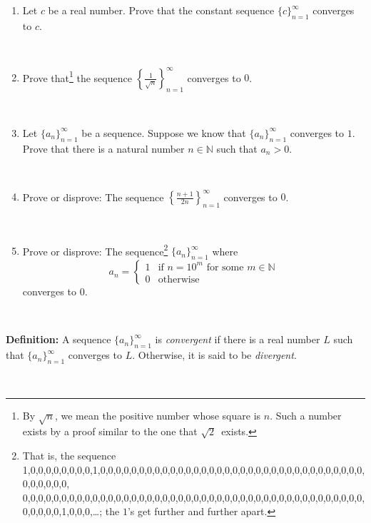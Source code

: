 \documentclass[12pt]{amsart}
\newcommand{\N}{\mathbb{N}}
\newcommand{\ds}{\displaystyle}
\begin{document}
\begin{enumerate}
\item Let $c$ be a real number. Prove that the constant sequence $\{ c\}_{n=1}^\infty$ converges to $c$.

\



\item Prove that\footnote{By $\sqrt{n}$, we mean the positive number whose square is $n$. Such a number exists by a proof similar to the one that $\sqrt{2}$~exists.} the sequence $\ds \left\{ \frac{1}{\sqrt{n}} \right\}_{n=1}^\infty$ converges to $0$.

\



\item Let $\{a_n\}_{n=1}^\infty$ be a sequence. Suppose we know that $\{a_n\}_{n=1}^\infty$ converges to $1$. Prove that there is a natural number $n\in \N$ such that $a_n>0$.

\



\item Prove or disprove: The sequence $\ds \left\{\frac{n+1}{2n} \right\}_{n=1}^\infty$ converges to $0$.

\



\item Prove or disprove: The sequence\footnote{That is, the sequence 1,0,0,0,0,0,0,0,0,1,0,0,0,0,0,0,0,0,0,0,0,0,0,0,0,0,0,0,0,0,0,0,0,0,0,0,0,0,0,0,0,0,0,0,0,0,0,0,0,0,\\
0,0,0,0,0,0,0,0,0,0,0,0,0,0,0,0,0,0,0,0,0,0,0,0,0,0,0,0,0,0,0,0,0,0,0,0,0,0,0,0,0,0,0,0,0,0,0,0,0,1,0,0,0,\dots; the $1$'s get further and further apart.} $\{a_n\}_{n=1}^\infty$ where
\[ a_n = \begin{cases} 1 &\text{if } n = 10^m \text{ for some } m\in \N \\
0 &\text{otherwise}\end{cases}
\]
converges to $0$. 


\


\end{enumerate}
\begin{framed}
\noindent \textbf{Definition:} A sequence $\{a_n\}_{n=1}^\infty$ is \emph{convergent} if there is a real number $L$ such that $\{a_n\}_{n=1}^\infty$ converges to $L$. Otherwise, it is said to be \emph{divergent}.
\end{framed}

\
\end{document}

